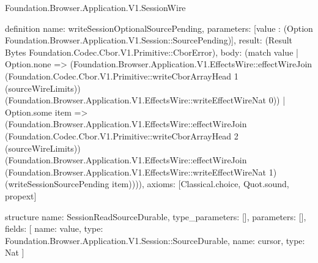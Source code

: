 \begin{lexlean}{Foundation.Browser.Application.V1.SessionWire}
\begin{semanticmodule}
definition{
  name: writeSessionOptionalSourcePending,
  parameters: [value : (Option Foundation.Browser.Application.V1.Session::SourcePending)],
  result: (Result Bytes Foundation.Codec.Cbor.V1.Primitive::CborError),
  body: (match value
    | Option.none => (Foundation.Browser.Application.V1.EffectsWire::effectWireJoin (Foundation.Codec.Cbor.V1.Primitive::writeCborArrayHead 1 (sourceWireLimits)) (Foundation.Browser.Application.V1.EffectsWire::writeEffectWireNat 0))
    | Option.some item => (Foundation.Browser.Application.V1.EffectsWire::effectWireJoin (Foundation.Codec.Cbor.V1.Primitive::writeCborArrayHead 2 (sourceWireLimits)) (Foundation.Browser.Application.V1.EffectsWire::effectWireJoin (Foundation.Browser.Application.V1.EffectsWire::writeEffectWireNat 1) (writeSessionSourcePending item)))),
  axioms: [Classical.choice, Quot.sound, propext]
}

structure{
  name: SessionReadSourceDurable,
  type_parameters: [],
  parameters: [],
  fields: [
    {name: value, type: Foundation.Browser.Application.V1.Session::SourceDurable},
    {name: cursor, type: Nat}
  ]
}


\end{semanticmodule}
\end{lexlean}
